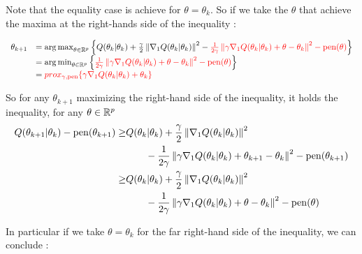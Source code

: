 \documentclass[a4paper]{article}
\begin{document}
\begin{myText}
\begin{dem}
    Note that the equality case is achieve for $\theta = \theta_k$. 
    So if we take the $\theta$ that achieve the maxima at the right-hands side of the inequality :
    
    \begin{equation}\label{prox_arrival} \begin{array}{llllllll} 
    \theta_{k+1} &= \operatorname*{arg\,max}_{\theta\in\mathbb R^p}\left\{ Q(\theta_k|\theta_k) + \frac \gamma2 \left\|\nabla_1 Q(\theta_k|\theta_k)\right\|^2 - \textcolor{red}{\frac 1{2\gamma}\left\|\gamma \nabla_1 Q(\theta_k|\theta_k) + \theta - \theta_k\right\|^2 -\mathrm{pen}(\theta)} \right\} 
        \\ &= \operatorname*{arg\,min}_{\theta\in\mathbb R^p} \left\{ \textcolor{red}{\frac 1{2\gamma}\left\|\gamma \nabla_1 Q(\theta_k|\theta_k) + \theta - \theta_k\right\|^2 -\mathrm{pen}(\theta) }\right\}
        \\ & = \textcolor{red}{prox_{\gamma, \mathrm{pen}}\{\gamma \nabla_1 Q(\theta_k|\theta_k) + \theta_k \}  }   \end{array}
    \end{equation}
    
    So for any $\theta_{k+1}$ maximizing the right-hand side of the inequality, it holds the inequality, for any $\theta\in\mathbb R^p$
    \begin{align*}
        Q(\theta_{k+1}|\theta_k) -\mathrm{pen}(\theta_{k+1}) 
        \geq & Q(\theta_k|\theta_k) 
                   + \frac \gamma2 \left\|\nabla_1 Q(\theta_k|\theta_k)\right\|^2 
                   \\ &\qquad - \frac 1{2\gamma}\left\|\gamma \nabla_1 Q(\theta_k|\theta_k) + \theta_{k+1} - \theta_k\right\|^2 -\mathrm{pen}(\theta_{k+1})
   \\   \geq & Q(\theta_k|\theta_k) 
                   + \frac \gamma2 \left\|\nabla_1 Q(\theta_k|\theta_k)\right\|^2 
                   \\ &\qquad - \frac 1{2\gamma}\left\|\gamma \nabla_1 Q(\theta_k|\theta_k) + \theta - \theta_k\right\|^2 -\mathrm{pen}(\theta)
    \end{align*}

    In particular if we take $\theta = \theta_k$ for the far right-hand side of the inequality, we can conclude : 

    \begin{center}
    \end{center}

    
    
        
    \iffalse
        \begin{equation}\label{prox_arrival} \stack{
            \max_{\theta\in\setr^p}\{ Q(\theta|\theta') -\pen(\theta) \} &\geq Q(\theta'|\theta') + \frac \gamma2 \norm{\nabla_1 Q(\theta'|\theta')}^2
            - \min_{\theta\in\setr^p} \left\{ \frac 1{2\gamma}\norm{\gamma \nabla_1 Q(\theta'|\theta') + \theta - \theta'}^2 -\pen(\theta) \right\}
            \\ & \geq Q(\theta'|\theta') + \frac \gamma2 \norm{\nabla_1 Q(\theta'|\theta')}^2
            - \tcr{\mbf{prox_{\gamma, \pen}(\gamma \nabla_1 Q(\theta'|\theta') + \theta)  }}          }
        \end{equation}
    \fi
        

\end{dem}
\end{myText}
\end{document}
